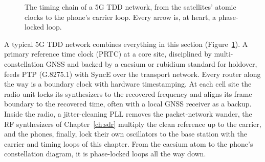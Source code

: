 \begin{figure}[htbp]\centering
{}
\caption{The timing chain of a 5G TDD network, from the satellites' atomic clocks to the phone's
carrier loop. Every arrow is, at heart, a phase-locked loop.}
\label{fig:ch10_timing_chain}
\end{figure}

\begin{inpractice}
A typical 5G TDD network combines everything in this section (Figure~\ref{fig:ch10_timing_chain}).
A primary reference time clock (PRTC) at a core site, disciplined by multi-constellation GNSS and
backed by a caesium or rubidium standard for holdover, feeds PTP (G.8275.1) with SyncE over the
transport network. Every router along the way is a boundary clock with hardware timestamping. At each
cell site the radio unit locks its synthesizers to the recovered frequency and aligns its frame
boundary to the recovered time, often with a local GNSS receiver as a backup. Inside the radio, a
jitter-cleaning PLL removes the packet-network wander, the RF synthesizers of Chapter~\ref{ch:sdr}
multiply the clean reference up to the carrier, and the phones, finally, lock their own oscillators
to the base station with the carrier and timing loops of this chapter. From the caesium atom to the
phone's constellation diagram, it is phase-locked loops all the way down.
\end{inpractice}

